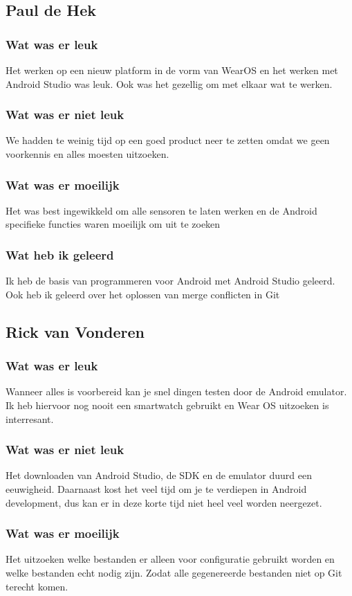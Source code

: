 \documentclass[../main.tex]{subfiles}
\begin{document}
\subsection{Paul de Hek}
\subsubsection{Wat was er leuk}
Het werken op een nieuw platform in de vorm van WearOS en het werken met Android Studio was leuk. Ook
was het gezellig om met elkaar wat te werken.
\subsubsection{Wat was er niet leuk}
We hadden te weinig tijd op een goed product neer te zetten omdat we geen voorkennis en alles moesten
uitzoeken.
\subsubsection{Wat was er moeilijk}
Het was best ingewikkeld om alle sensoren te laten werken en de Android specifieke functies waren
moeilijk om uit te zoeken
\subsubsection{Wat heb ik geleerd}
Ik heb de basis van programmeren voor Android met Android Studio geleerd. Ook heb ik geleerd over
het oplossen van merge conflicten in Git
\newpage

\subsection{Rick van Vonderen}
\subsubsection{Wat was er leuk}
Wanneer alles is voorbereid kan je snel dingen testen door de Android emulator.
Ik heb hiervoor nog nooit een smartwatch gebruikt en Wear OS uitzoeken is interresant.

\subsubsection{Wat was er niet leuk}
Het downloaden van Android Studio, de SDK en de emulator duurd een eeuwigheid.
Daarnaast kost het veel tijd om je te verdiepen in Android development,
dus kan er in deze korte tijd niet heel veel worden neergezet.

\subsubsection{Wat was er moeilijk}
Het uitzoeken welke bestanden er alleen voor configuratie gebruikt worden en
welke bestanden echt nodig zijn.
Zodat alle gegenereerde bestanden niet op Git terecht komen.
\end{document}
